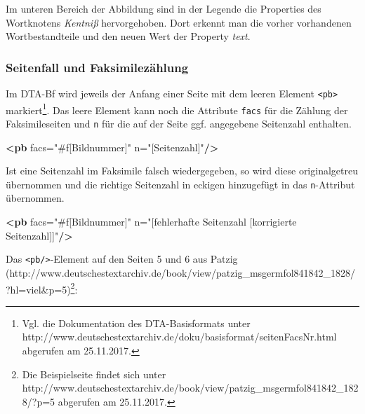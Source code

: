 \documentclass[12pt,ngerman,]{article}
\newenvironment{Shaded}{}{}
\newcommand{\KeywordTok}[1]{\textcolor[rgb]{0.00,0.44,0.13}{\textbf{#1}}}
\newcommand{\StringTok}[1]{\textcolor[rgb]{0.25,0.44,0.63}{#1}}
\newcommand{\OtherTok}[1]{\textcolor[rgb]{0.00,0.44,0.13}{#1}}
\begin{document}
Im unteren Bereich der Abbildung sind in der Legende die Properties des
Wortknotens \emph{Kentniß} hervorgehoben. Dort erkennt man die vorher
vorhandenen Wortbestandteile und den neuen Wert der Property
\emph{text}.

\subsubsection{Seitenfall und
Faksimilezählung}\label{seitenfall-und-faksimilezuxe4hlung}

Im DTA-Bf wird jeweils der Anfang einer Seite mit dem leeren Element
\texttt{\textless{}pb\textgreater{}} markiert\footnote{Vgl. die
  Dokumentation des DTA-Basisformats unter
  http://www.deutschestextarchiv.de/doku/basisformat/seitenFacsNr.html
  abgerufen am 25.11.2017.}. Das leere Element kann noch die Attribute
\texttt{facs} für die Zählung der Faksimileseiten und \texttt{n} für die
auf der Seite ggf. angegebene Seitenzahl enthalten.

\begin{Shaded}
\begin{Highlighting}[]
\KeywordTok{<pb}\OtherTok{ facs=}\StringTok{"#f[Bildnummer]"}\OtherTok{ n=}\StringTok{"[Seitenzahl]"}\KeywordTok{/>}
\end{Highlighting}
\end{Shaded}

Ist eine Seitenzahl im Faksimile falsch wiedergegeben, so wird diese
originalgetreu übernommen und die richtige Seitenzahl in eckigen
hinzugefügt in das \texttt{n}-Attribut übernommen.

\begin{Shaded}
\begin{Highlighting}[]
\KeywordTok{<pb}\OtherTok{ facs=}\StringTok{"#f[Bildnummer]"}
\OtherTok{    n=}\StringTok{"[fehlerhafte Seitenzahl [korrigierte Seitenzahl]]"}\KeywordTok{/>}
\end{Highlighting}
\end{Shaded}

Das \texttt{\textless{}pb/\textgreater{}}-Element auf den Seiten 5 und 6
aus Patzig
(http://www.deutschestextarchiv.de/book/view/patzig\_msgermfol841842\_1828/
?hl=viel\&p=5)\footnote{Die Beispielseite findet sich unter
  http://www.deutschestextarchiv.de/book/view/patzig\_msgermfol841842\_1828/?p=5
  abgerufen am 25.11.2017.}:
\end{document}
